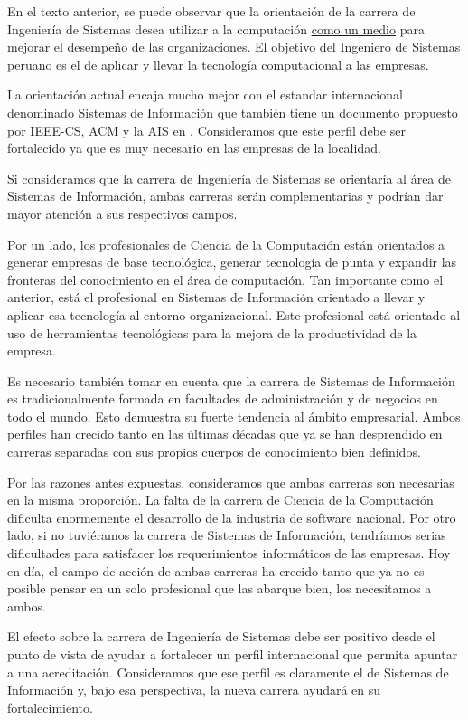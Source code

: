 En el texto anterior, se puede observar que la orientación de la carrera de Ingeniería de Sistemas desea utilizar a la computación \underline{como un medio} para mejorar el desempeño de las organizaciones. El objetivo del Ingeniero de Sistemas peruano es el de \underline{aplicar} y llevar la tecnología computacional a las empresas.

La orientación actual encaja mucho mejor con el estandar
internacional denominado Sistemas de Información que también tiene
un documento propuesto por IEEE-CS, ACM y la \ac{AIS} en
\cite{InformationSystems2002Journal}. Consideramos que este perfil debe ser
fortalecido ya que es muy necesario en las empresas de la localidad.

Si consideramos que la carrera de Ingeniería de Sistemas se
orientaría al área de Sistemas de Información, ambas carreras serán
complementarias y podrían dar mayor atención a sus respectivos
campos.

Por un lado, los profesionales de Ciencia de la Computación están orientados a generar empresas
de base tecnológica, generar tecnología de punta y expandir las
fronteras del conocimiento en el área de computación. Tan importante
como el anterior, está el profesional en Sistemas de Información
orientado a llevar y aplicar esa tecnología al entorno organizacional. Este profesional está orientado al uso de
herramientas tecnológicas para la mejora de la productividad de la empresa.

Es necesario también tomar en cuenta que la carrera de Sistemas de Información es tradicionalmente 
formada en facultades de administración y de negocios en todo el mundo. Esto demuestra su fuerte 
tendencia al ámbito empresarial. Ambos perfiles han crecido tanto en las últimas décadas que ya se 
han desprendido en carreras separadas con sus propios cuerpos de conocimiento bien definidos.

Por las razones antes expuestas, consideramos que ambas carreras son necesarias en la misma proporción. 
La falta de la carrera de Ciencia de la Computación dificulta enormemente el desarrollo de la industria de 
software nacional. Por otro lado, si no tuviéramos la carrera de Sistemas de Información, tendríamos 
serias dificultades para satisfacer los requerimientos informáticos de las empresas. Hoy en día, el 
campo de acción de ambas carreras ha crecido tanto que ya no es posible pensar en un solo profesional 
que las abarque bien, los necesitamos a ambos.

El efecto sobre la carrera de Ingeniería de Sistemas debe ser positivo desde el punto de vista de 
ayudar a fortalecer un perfil internacional que permita apuntar a una acreditación. Consideramos 
que ese perfil es claramente el de Sistemas de Información y, bajo esa perspectiva, la nueva 
carrera ayudará en su fortalecimiento.
